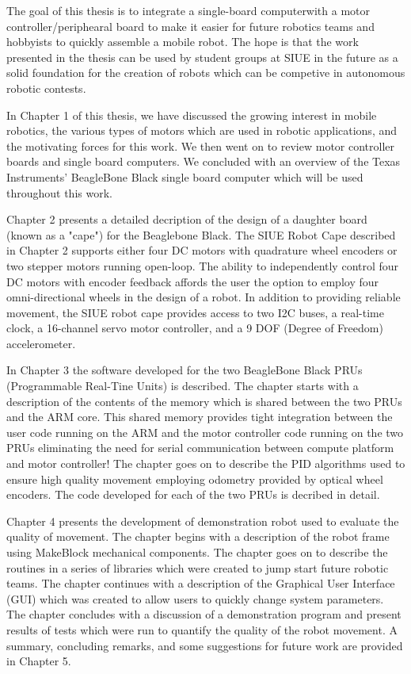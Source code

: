 \documentclass[12pt,oneside,final]{siuethesis}
\theoremstyle{definition}
\begin{document}
The goal of this thesis is to integrate a single-board computerwith a motor controller/periphearal board to make it easier for future robotics teams and hobbyists to quickly assemble a mobile robot. The hope is that the work presented in the thesis can be used by student groups at SIUE in the future as a solid foundation for the creation of robots which can be competive in  autonomous robotic contests.

In Chapter 1 of this thesis, we have discussed the growing interest in mobile robotics, the various types of motors which are used in robotic applications, and the motivating forces for this work.  We then went on to review motor controller boards and single board computers. We concluded with an overview of the Texas Instruments' BeagleBone Black single board computer which will be used throughout this work.

Chapter 2 presents a detailed decription of the design of a daughter board (known as a "cape") for the Beaglebone Black.  The SIUE Robot Cape described in Chapter 2 supports either four DC motors with quadrature wheel encoders or two stepper motors running open-loop. The ability to independently control four DC motors with encoder feedback affords the user the option to employ four omni-directional wheels in the design of a robot. In addition to providing reliable movement, the SIUE robot cape provides access to two I2C buses, a real-time clock, a 16-channel servo motor controller, and a 9 DOF (Degree of Freedom) accelerometer. 

In Chapter 3 the software developed for the two BeagleBone Black PRUs (Programmable Real-Tine Units) is described.  The chapter starts with a description of the contents of the memory which is shared between the two PRUs and the ARM core. This shared memory provides tight integration between the user code running on the ARM and the motor controller code running on the two PRUs eliminating the need for serial communication between compute platform and motor controller! The chapter goes on to describe the PID algorithms used to ensure high quality movement employing odometry provided by optical wheel encoders. The code developed for each of the two PRUs is decribed in detail.

Chapter 4 presents the development of demonstration robot used to evaluate the quality of movement. The chapter begins with a description of the robot frame using MakeBlock mechanical components. The chapter goes on to describe the routines in a series of libraries which were created to jump start future robotic teams. The chapter continues with a description of the Graphical User Interface (GUI) which was created to allow users to quickly change system parameters. The chapter concludes with a discussion of a demonstration program and present results of tests which were run to quantify the quality of the robot movement. A summary, concluding remarks, and some suggestions for future work are provided in Chapter 5.
\end{document}

